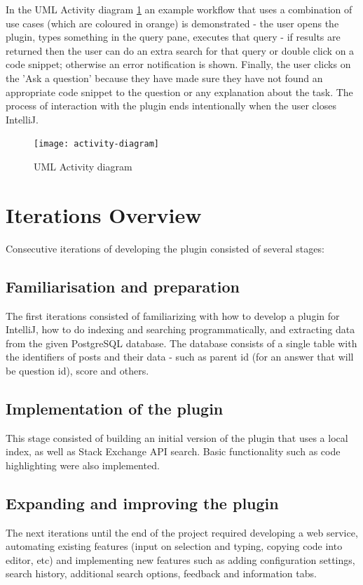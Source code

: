 \documentclass{l4proj}
\begin{document}
In the UML Activity diagram \ref{fig:activity-diagram} an example workflow that uses a combination of use cases (which are coloured in orange) is demonstrated - the user opens the plugin, types something in the query pane, executes that query - if results are returned then the user can do an extra search for that query or double click on a code snippet; otherwise an error notification is shown. Finally, the user clicks on the 'Ask a question' because they have made sure they have not found an appropriate code snippet to the question or any explanation about the task. The process of interaction with the plugin ends intentionally when the user closes IntelliJ.

\begin{figure}[H]
\texttt{[image: activity-diagram]}
\centering
\caption{UML Activity diagram}\label{activity-diagram}
\label{fig:activity-diagram}
\end{figure}

\section{Iterations Overview}
Consecutive iterations of developing the plugin consisted of several stages:

\subsection{Familiarisation and preparation}
The first iterations consisted of familiarizing with how to develop a plugin for IntelliJ, how to do indexing and searching programmatically, and extracting data from the given PostgreSQL database. The database consists of a single table with the identifiers of posts and their data - such as parent id (for an answer that will be question id), score and others.

\subsection{Implementation of the plugin}
This stage consisted of building an initial version of the plugin that uses a local index, as well as Stack Exchange API search. Basic functionality such as code highlighting were also implemented.

\subsection{Expanding and improving the plugin}
The next iterations until the end of the project required developing a web service, automating existing features (input on selection and typing, copying code into editor, etc) and implementing new features such as adding configuration settings, search history, additional search options, feedback and information tabs.
\end{document}
